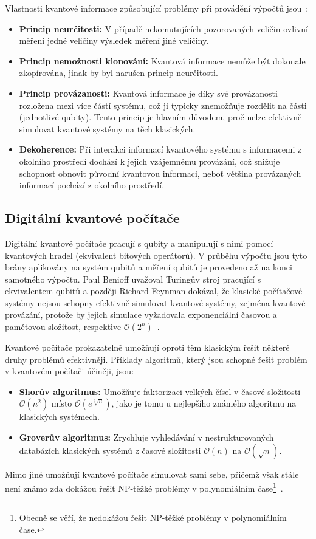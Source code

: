 Vlastnosti kvantové informace způsobující problémy při provádění výpočtů jsou~\cite{NaturalComputing}:
\begin{itemize}
    \item \textbf{Princip neurčitosti:} V případě nekomutujících pozorovaných veličin ovlivní měření jedné veličiny výsledek měření jiné veličiny. 
    \item \textbf{Princip nemožnosti klonování:} Kvantová informace nemůže být dokonale zkopírována, jinak by byl narušen princip neurčitosti. 
    \item \textbf{Princip provázanosti:} Kvantová informace je díky své provázanosti rozložena mezi více částí systému, což ji typicky znemožňuje rozdělit na části (jednotlivé qubity). Tento princip je hlavním důvodem, proč nelze efektivně simulovat kvantové systémy na těch klasických. 
    \item \textbf{Dekoherence:} Při interakci informací kvantového systému s informacemi z okolního prostředí dochází k jejich vzájemnému provázání, což snižuje schopnost obnovit původní kvantovou informaci, neboť většina provázaných informací pochází z okolního prostředí. 
\end{itemize}

\subsection{Digitální kvantové počítače}
Digitální kvantové počítače pracují s qubity a manipulují s nimi pomocí kvantových hradel (ekvivalent bitových operátorů).
V průběhu výpočtu jsou tyto brány aplikovány na systém qubitů a měření qubitů je provedeno až na konci samotného výpočtu. 
Paul Benioff uvažoval Turingův stroj pracující s ekvivalentem qubitů a později Richard Feynman dokázal, že klasické počítačové systémy nejsou schopny efektivně simulovat kvantové systémy, zejména kvantové provázání, protože by jejich simulace vyžadovala exponenciální časovou a paměťovou složitost, respektive $\mathcal{O}\left( 2^n \right)$~\cite{NaturalComputing,QuantumComuting-Introduction}. 

Kvantové počítače prokazatelně umožňují oproti těm klasickým řešit některé druhy problémů efektivněji. 
Příklady algoritmů, který jsou schopné řešit problém v kvantovém počítači účiněji, jsou: 
\begin{itemize}
    \item \textbf{Shorův algoritmus:} Umožňuje faktorizaci velkých čísel v časové složitosti $\mathcal{O}\left( n^2 \right)$ místo $\mathcal{O}\left(e^{\sqrt[3]{n}} \right)$, jako je tomu u nejlepšího známého algoritmu na klasických systémech.
    \item \textbf{Groverův algoritmus:} Zrychluje vyhledávání v nestrukturovaných databázích klasických systémů z časové složitosti $\mathcal{O}\left( n \right)$ na $\mathcal{O}\left( \sqrt{n} \right)$. 
\end{itemize}
Mimo jiné umožňují kvantové počítače simulovat sami sebe, přičemž však stále není známo zda dokážou řešit NP-těžké problémy v polynomiálním čase\footnote{Obecně se věří, že nedokážou řešit NP-těžké problémy v polynomiálním čase.}~\cite{NaturalComputing}. 

